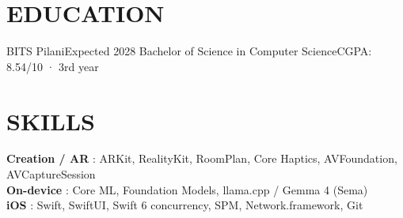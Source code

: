 \section{EDUCATION}
  \resumeSubHeadingListStart
    \resumeSubheading
      {BITS Pilani}{Expected 2028}
      {Bachelor of Science in Computer Science}{CGPA: 8.54/10 · 3rd year}
  \resumeSubHeadingListEnd

\section{SKILLS}
 \begin{itemize}[leftmargin=0in, label={}]
    \small{\item{
     \textbf{Creation / AR} {: ARKit, RealityKit, RoomPlan, Core Haptics, AVFoundation, AVCaptureSession} \vspace{1pt} \\
     \textbf{On-device} {: Core ML, Foundation Models, llama.cpp / Gemma 4 (Sema)} \vspace{1pt} \\
     \textbf{iOS} {: Swift, SwiftUI, Swift 6 concurrency, SPM, Network.framework, Git}
    }}
 \end{itemize}


